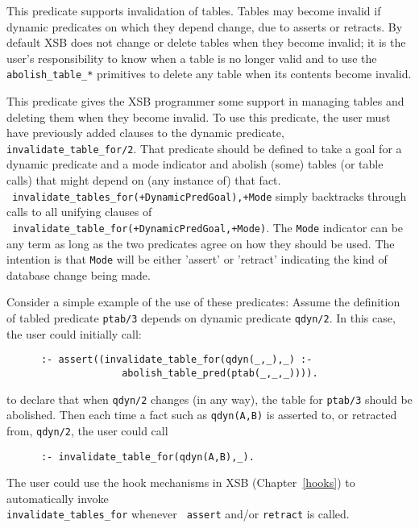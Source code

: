 \begin{description}
\begin{description}
{
%
This predicate supports invalidation of tables.  Tables may become
invalid if dynamic predicates on which they depend change, due to
asserts or retracts.  By default XSB does not change or delete tables
when they become invalid; it is the user's responsibility to know when
a table is no longer valid and to use the {\tt abolish\_table\_*}
primitives to delete any table when its contents become invalid.

This predicate gives the XSB programmer some support in managing
tables and deleting them when they become invalid.  To use this
predicate, the user must have previously added clauses to the dynamic
predicate, {\tt invalidate\_table\_for/2}.  That predicate should be
defined to take a goal for a dynamic predicate and a mode indicator
and abolish (some) tables (or table calls) that might depend on (any
instance of) that fact.  \\ {\tt
invalidate\_tables\_for(+DynamicPredGoal),+Mode} simply backtracks
through calls to all unifying clauses of \\ {\tt
invalidate\_table\_for(+DynamicPredGoal,+Mode)}.  The {\tt Mode}
indicator can be any term as long as the two predicates agree on how
they should be used.  The intention is that {\tt Mode} will be either
'assert' or 'retract' indicating the kind of database change being
made.

Consider a simple example of the use of these predicates: Assume the
definition of tabled predicate {\tt ptab/3} depends on dynamic predicate
{\tt qdyn/2}.  In this case, the user could initially call:
\begin{verbatim}
      :- assert((invalidate_table_for(qdyn(_,_),_) :-
                    abolish_table_pred(ptab(_,_,_)))).
\end{verbatim}
to declare that when {\tt qdyn/2} changes (in any way), the table for {\tt ptab/3}
should be abolished.  Then each time a fact such as {\tt qdyn(A,B)} is
asserted to, or retracted from, {\tt qdyn/2}, the user could call
\begin{verbatim}
      :- invalidate_table_for(qdyn(A,B),_).
\end{verbatim}

The user could use the hook mechanisms in XSB (Chapter~\ref{hooks}) to
automatically invoke \\ {\tt invalidate\_tables\_for} whenever {\tt
  assert} and/or {\tt retract} is called.

}
\end{description}
\end{description}
